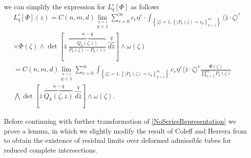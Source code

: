 \documentclass[11pt,reqno]{amsart}
\numberwithin{equation}{section}
\begin{document}
we can simplify the expression for
$L_q^{\epsilon}\left[\Phi\right]$ as follows
\begin{multline}\label{NoSeriesRepresentation}
L_q^{\epsilon}\left[\Phi\right](z)
=C(n,m,d)\lim_{\stackrel{\eta\to 1}{\eta<1}}\sum_{r=0}^{\infty}
c_r\eta^r\cdot\int_{\left\{|\zeta|=1,\left\{|P_k(\zeta)=\epsilon_k\right\}_{k=1}^m\right\}}
\langle{\bar z}\cdot\zeta\rangle^r\\
\times\Phi(\zeta)\wedge\det\left[{\bar z}\
\overbrace{\frac{Q_k(\zeta,z)}{P_k(\zeta)-P_k(z)}}^{n-q}\
\overbrace{d{\bar z}}^{q}\right]\wedge\omega(\zeta)\\
=C(n,m,d)\lim_{\stackrel{\eta\to 1}{\eta<1}}\sum_{r=0}^{\infty}
\int_{\left\{|\zeta|=1,\left\{|P_k(\zeta)=\epsilon_k\right\}_{k=1}^m\right\}}
c_r\eta^r\langle{\bar z}\cdot\zeta\rangle^r\frac{\Phi(\zeta)}{\prod_{k=1}^mP_k(\zeta)}\\
\bigwedge\det\left[{\bar z}\ \overbrace{Q_k(\zeta,z)}^{n-q}\
\overbrace{d{\bar z}}^{q}\right]\wedge\omega(\zeta).
\end{multline}

\indent
Before continuing with further transformation of
\eqref{NoSeriesRepresentation} we prove a lemma, in which we slightly modify
the result of Coleff and Herrera from \cite{CH} to obtain the existence of residual limits
over deformed admissible tubes for reduced complete intersections.
\end{document}
